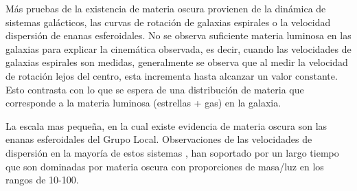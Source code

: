 

Más pruebas de la existencia de materia oscura provienen de la dinámica de sistemas galácticos, las curvas de rotación de galaxias espirales o la velocidad dispersión de enanas esferoidales. No se observa suficiente materia luminosa en las galaxias para explicar la cinemática observada, es decir, cuando las velocidades de galaxias espirales son medidas, generalmente se observa que al medir la velocidad de rotación lejos del centro, esta incrementa hasta alcanzar un valor constante. Esto contrasta con lo que se espera de una distribución de materia que corresponde a la materia luminosa (estrellas + gas) en la galaxia.

La escala mas pequeña, en la cual existe evidencia de materia oscura son las enanas esferoidales del Grupo Local. Observaciones de las velocidades de dispersión en la mayoría de estos sistemas \cite{1988IAUS..130..409A}, han soportado por un largo tiempo que son dominadas por materia oscura con proporciones de masa/luz en los rangos de 10-100.

